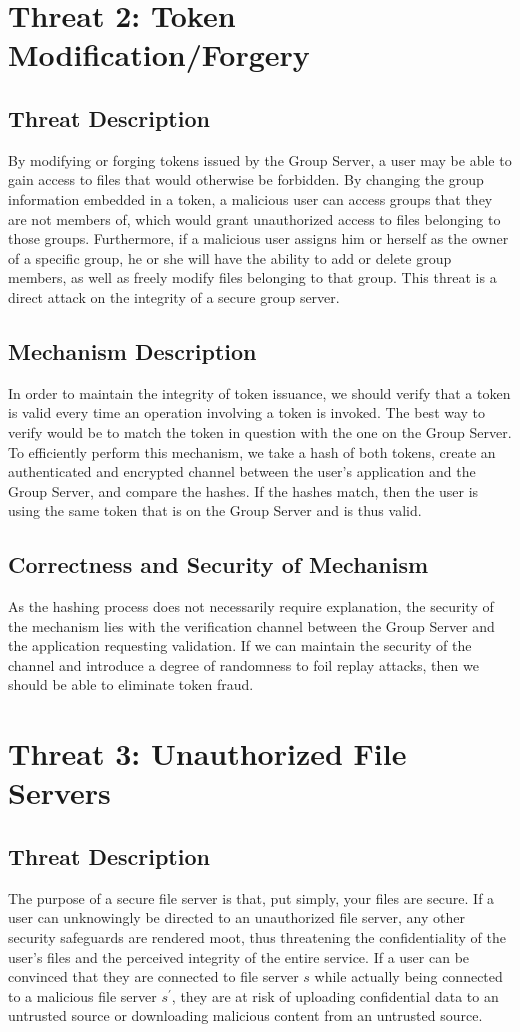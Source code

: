 \documentclass[11pt]{article}
\begin{document}
\section{Threat 2: Token Modification/Forgery}
\subsection{Threat Description}
By modifying or forging tokens issued by the Group Server, a user may be able to gain access to files that would otherwise be forbidden. By changing the group information embedded in a token, a malicious user can access groups that they are not members of, which would grant unauthorized access to files belonging to those groups. Furthermore, if a malicious user assigns him or herself as the owner of a specific group, he or she will have the ability to add or delete group members, as well as freely modify files belonging to that group. This threat is a direct attack on the integrity of a secure group server.
\subsection{Mechanism Description}
In order to maintain the integrity of token issuance, we should verify that a token is valid every time an operation involving a token is invoked. The best way to verify would be to match the token in question with the one on the Group Server. To efficiently perform this mechanism, we take a hash of both tokens, create an authenticated and encrypted channel between the user's application and the Group Server, and compare the hashes. If the hashes match, then the user is using the same token that is on the Group Server and is thus valid.
\subsection{Correctness and Security of Mechanism}
As the hashing process does not necessarily require explanation, the security of the mechanism lies with the verification channel between the Group Server and the application requesting validation. If we can maintain the security of the channel and introduce a degree of randomness to foil replay attacks, then we should be able to eliminate token fraud.
\section{Threat 3: Unauthorized File Servers}
\subsection{Threat Description}
The purpose of a secure file server is that, put simply, your files are secure. If a user can unknowingly be directed to an unauthorized file server, any other security safeguards are rendered moot, thus threatening the confidentiality of the user's files and the perceived integrity of the entire service. If a user can be convinced that they are connected to file server $s$ while actually being connected to a malicious file server $s^\prime$, they are at risk of uploading confidential data to an untrusted source or downloading malicious content from an untrusted source.
\end{document}

